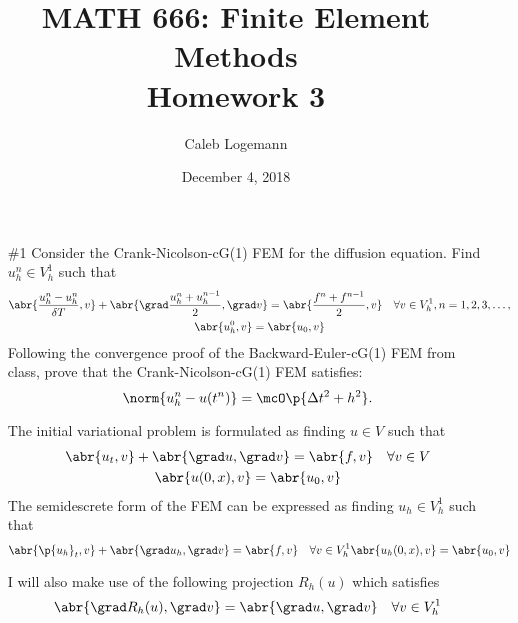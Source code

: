 \documentclass[11pt, titlepage]{article}
\author{Caleb Logemann}
\title{MATH 666: Finite Element Methods \\ Homework 3}
\date{December 4, 2018}
\begin{document}
\maketitle

%
\begin{enumerate}
  \item[\#1]
    Consider the Crank-Nicolson-cG(1) FEM for the diffusion equation.
    Find $u^n_h \in V^1_h$ such that
    \begin{gather*}
      \abr{\frac{u^n_h - u^n_h}{\delta T}, v} + 
      \abr{\grad \frac{u_h^n + u_h^{n-1}}{2}, \grad v} = 
      \abr{\frac{f^n + f^{n-1}}{2}, v} 
      \quad \forall v \in V^1_h, n = 1, 2, 3, \ldots, \\
      \abr{u^0_h, v} = \abr{u_0, v}
    \end{gather*}
    Following the convergence proof of the Backward-Euler-cG(1) FEM from class,
    prove that the Crank-Nicolson-cG(1) FEM satisfies:
    \[
      \norm{u^n_h - u(t^n)} = \mcO\p{\Delta t^2 + h^2}.
    \]

    The initial variational problem is formulated as finding $u \in V$ such that
    \begin{gather*}
      \abr{u_t, v} + \abr{\grad u, \grad v} = \abr{f, v} \quad \forall v \in V \\
      \abr{u(0, x), v} = \abr{u_0, v}
    \end{gather*}
    The semidescrete form of the FEM can be expressed as finding $u_h \in V^1_h$
    such that
    \[
      \abr{\p{u_h}_t, v} + \abr{\grad u_h, \grad v} = \abr{f, v} \quad \forall v \in V^1_h
      \abr{u_h(0, x), v} = \abr{u_0, v}
    \]

    I will also make use of the following projection $R_h(u)$ which satisfies
    \[
      \abr{\grad R_h(u), \grad v} = \abr{\grad u, \grad v} \quad \forall v \in V^1_h
    \]


\end{enumerate}
\end{document}
